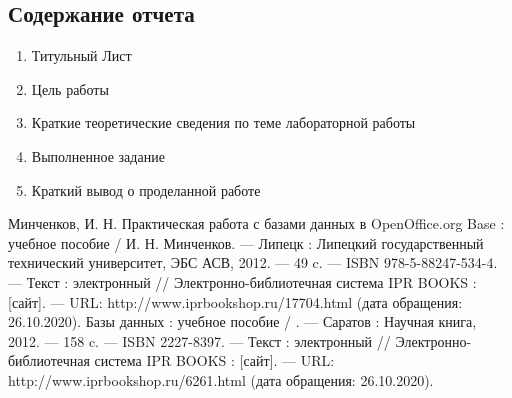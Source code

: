 \documentclass[a4paper]{article}
\begin{document}
\subsection{Содержание отчета}
\begin{enumerate}
  \item Титульный Лист
  \item Цель работы
  \item Краткие теоретические сведения по теме лабораторной работы
  \item Выполненное задание
  \item Краткий вывод о проделанной работе
\end{enumerate}

\begin{thebibliography}{3}
Минченков, И. Н. Практическая работа с базами данных в OpenOffice.org Base : учебное пособие / И.
Н. Минченков. — Липецк : Липецкий государственный технический университет, ЭБС АСВ, 2012. — 49 c. — ISBN 978-5-88247-534-4. — Текст : электронный // Электронно-библиотечная система IPR BOOKS : [сайт]. — URL: http://www.iprbookshop.ru/17704.html (дата обращения: 26.10.2020).
Базы данных : учебное пособие / . — Саратов : Научная книга, 2012. — 158 c. — ISBN 2227-8397. — Текст : электронный // Электронно-библиотечная система IPR BOOKS : [сайт]. — URL: http://www.iprbookshop.ru/6261.html (дата обращения: 26.10.2020).
\end{thebibliography}
\end{document}
